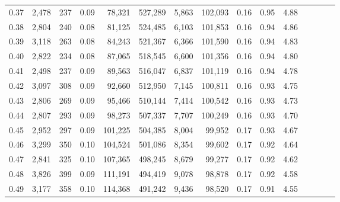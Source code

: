 \begin{tabular}{rrrcrrrrrrrrrrr}
0.37 &   2,478 &    237 &                                       0.09 &   78,321 &  527,289 &    5,863 &  102,093 &  0.16 &  0.95 &                         4.88 \\
0.38 &   2,804 &    240 &                                       0.08 &   81,125 &  524,485 &    6,103 &  101,853 &  0.16 &  0.94 &                         4.86 \\
0.39 &   3,118 &    263 &                                       0.08 &   84,243 &  521,367 &    6,366 &  101,590 &  0.16 &  0.94 &                         4.83 \\
0.40 &   2,822 &    234 &                                       0.08 &   87,065 &  518,545 &    6,600 &  101,356 &  0.16 &  0.94 &                         4.80 \\
0.41 &   2,498 &    237 &                                       0.09 &   89,563 &  516,047 &    6,837 &  101,119 &  0.16 &  0.94 &                         4.78 \\
0.42 &   3,097 &    308 &                                       0.09 &   92,660 &  512,950 &    7,145 &  100,811 &  0.16 &  0.93 &                         4.75 \\
0.43 &   2,806 &    269 &                                       0.09 &   95,466 &  510,144 &    7,414 &  100,542 &  0.16 &  0.93 &                         4.73 \\
0.44 &   2,807 &    293 &                                       0.09 &   98,273 &  507,337 &    7,707 &  100,249 &  0.16 &  0.93 &                         4.70 \\
0.45 &   2,952 &    297 &                                       0.09 &  101,225 &  504,385 &    8,004 &   99,952 &  0.17 &  0.93 &                         4.67 \\
0.46 &   3,299 &    350 &                                       0.10 &  104,524 &  501,086 &    8,354 &   99,602 &  0.17 &  0.92 &                         4.64 \\
0.47 &   2,841 &    325 &                                       0.10 &  107,365 &  498,245 &    8,679 &   99,277 &  0.17 &  0.92 &                         4.62 \\
0.48 &   3,826 &    399 &                                       0.09 &  111,191 &  494,419 &    9,078 &   98,878 &  0.17 &  0.92 &                         4.58 \\
0.49 &   3,177 &    358 &                                       0.10 &  114,368 &  491,242 &    9,436 &   98,520 &  0.17 &  0.91 &                         4.55 \\

\end{tabular}
